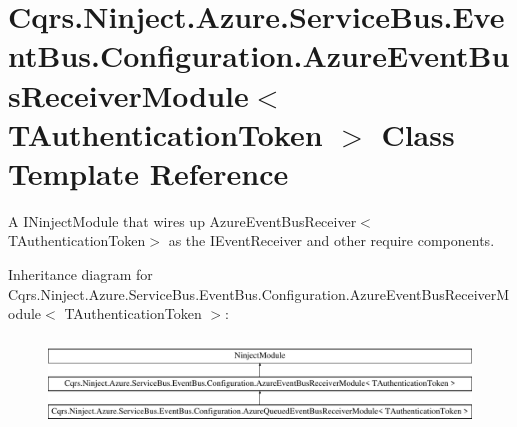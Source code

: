\hypertarget{classCqrs_1_1Ninject_1_1Azure_1_1ServiceBus_1_1EventBus_1_1Configuration_1_1AzureEventBusReceiverModule}{}\section{Cqrs.\+Ninject.\+Azure.\+Service\+Bus.\+Event\+Bus.\+Configuration.\+Azure\+Event\+Bus\+Receiver\+Module$<$ T\+Authentication\+Token $>$ Class Template Reference}
\label{classCqrs_1_1Ninject_1_1Azure_1_1ServiceBus_1_1EventBus_1_1Configuration_1_1AzureEventBusReceiverModule}


A I\+Ninject\+Module that wires up Azure\+Event\+Bus\+Receiver$<$\+T\+Authentication\+Token$>$ as the I\+Event\+Receiver and other require components.  


Inheritance diagram for Cqrs.\+Ninject.\+Azure.\+Service\+Bus.\+Event\+Bus.\+Configuration.\+Azure\+Event\+Bus\+Receiver\+Module$<$ T\+Authentication\+Token $>$\+:\begin{figure}[H]
\begin{center}
\leavevmode
\includegraphics[height=2.376238cm]{classCqrs_1_1Ninject_1_1Azure_1_1ServiceBus_1_1EventBus_1_1Configuration_1_1AzureEventBusReceiverModule}
\end{center}
\end{figure}

